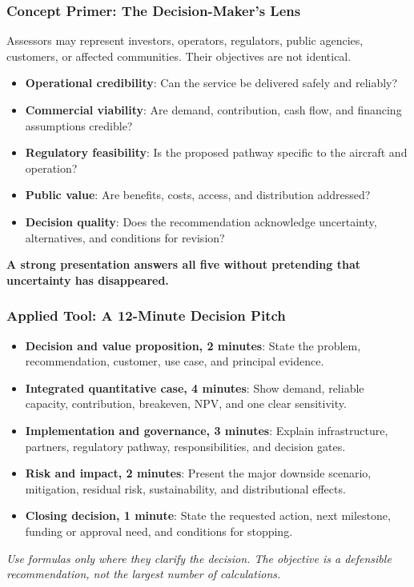 \documentclass{beamer}
\begin{document}
\begin{frame}[t]
\frametitle{Concept Primer: The Decision-Maker's Lens}
Assessors may represent investors, operators, regulators, public agencies, customers, or affected communities. Their objectives are not identical.
\begin{itemize}
\item \textbf{Operational credibility}: Can the service be delivered safely and reliably?
\item \textbf{Commercial viability}: Are demand, contribution, cash flow, and financing assumptions credible?
\item \textbf{Regulatory feasibility}: Is the proposed pathway specific to the aircraft and operation?
\item \textbf{Public value}: Are benefits, costs, access, and distribution addressed?
\item \textbf{Decision quality}: Does the recommendation acknowledge uncertainty, alternatives, and conditions for revision?
\end{itemize}
\textbf{A strong presentation answers all five without pretending that uncertainty has disappeared.}
\end{frame}

\begin{frame}[t]
\frametitle{Applied Tool: A 12-Minute Decision Pitch}
\begin{itemize}
\item \textbf{Decision and value proposition, 2 minutes}: State the problem, recommendation, customer, use case, and principal evidence.
\item \textbf{Integrated quantitative case, 4 minutes}: Show demand, reliable capacity, contribution, breakeven, NPV, and one clear sensitivity.
\item \textbf{Implementation and governance, 3 minutes}: Explain infrastructure, partners, regulatory pathway, responsibilities, and decision gates.
\item \textbf{Risk and impact, 2 minutes}: Present the major downside scenario, mitigation, residual risk, sustainability, and distributional effects.
\item \textbf{Closing decision, 1 minute}: State the requested action, next milestone, funding or approval need, and conditions for stopping.
\end{itemize}
\textit{Use formulas only where they clarify the decision. The objective is a defensible recommendation, not the largest number of calculations.}
\end{frame}
\end{document}
